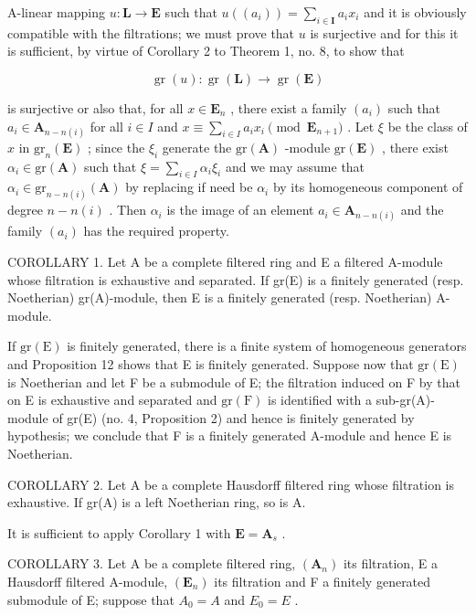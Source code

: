 A-linear mapping \(u: \mathbf{L} \to \mathbf{E}\) such that \(u((a_i)) = \sum_{i \in \mathbf{I}} a_i x_i\) and it is obviously compatible with the filtrations; we must prove that \(u\) is surjective and for this it is sufficient, by virtue of Corollary 2 to Theorem 1, no. 8, to show that

\[
\operatorname{gr} (u): \operatorname{gr} (\mathbf {L}) \rightarrow \operatorname{gr} (\mathbf {E})
\]

is surjective or also that, for all \(x \in \mathbf{E}_n\) , there exist a family \((a_i)\) such that \(a_i \in \mathbf{A}_{n-n(i)}\) for all \(i \in I\) and \(x \equiv \sum_{i \in I} a_i x_i \pmod{\mathbf{E}_{n+1}}\) . Let \(\xi\) be the class of \(x\) in \(\mathrm{gr}_n(\mathbf{E})\) ; since the \(\xi_i\) generate the \(\mathrm{gr}(\mathbf{A})\) -module \(\mathrm{gr}(\mathbf{E})\) , there exist \(\alpha_i \in \mathrm{gr}(\mathbf{A})\) such that \(\xi = \sum_{i \in I} \alpha_i \xi_i\) and we may assume that \(\alpha_i \in \mathrm{gr}_{n-n(i)}(\mathbf{A})\) by replacing if need be \(\alpha_i\) by its homogeneous component of degree \(n - n(i)\) . Then \(\alpha_i\) is the image of an element \(a_i \in \mathbf{A}_{n-n(i)}\) and the family \((a_i)\) has the required property.

COROLLARY 1. Let A be a complete filtered ring and E a filtered A-module whose filtration is exhaustive and separated. If gr(E) is a finitely generated (resp. Noetherian) gr(A)-module, then E is a finitely generated (resp. Noetherian) A-module.

If \(\mathrm{gr}(\mathrm{E})\) is finitely generated, there is a finite system of homogeneous generators and Proposition 12 shows that E is finitely generated. Suppose now that \(\mathrm{gr}(\mathrm{E})\) is Noetherian and let F be a submodule of E; the filtration induced on F by that on E is exhaustive and separated and \(\mathrm{gr}(\mathrm{F})\) is identified with a sub-gr(A)-module of gr(E) (no. 4, Proposition 2) and hence is finitely generated by hypothesis; we conclude that F is a finitely generated A-module and hence E is Noetherian.

COROLLARY 2. Let A be a complete Hausdorff filtered ring whose filtration is exhaustive. If gr(A) is a left Noetherian ring, so is A.

It is sufficient to apply Corollary 1 with \(\mathbf{E} = \mathbf{A}_s\) .

COROLLARY 3. Let A be a complete filtered ring, \((\mathbf{A}_{n})\) its filtration, E a Hausdorff filtered A-module, \((\mathbf{E}_{n})\) its filtration and F a finitely generated submodule of E; suppose that \(A_{0} = A\) and \(E_{0} = E\) .

